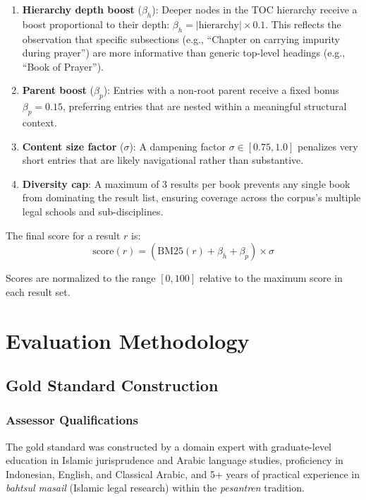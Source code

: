\documentclass[preprint,12pt,authoryear]{elsarticle}
\begin{document}
\begin{enumerate}
    \item \textbf{Hierarchy depth boost} ($\beta_h$): Deeper nodes in the TOC hierarchy receive a boost proportional to their depth: $\beta_h = |\text{hierarchy}| \times 0.1$. This reflects the observation that specific subsections (e.g., ``Chapter on carrying impurity during prayer'') are more informative than generic top-level headings (e.g., ``Book of Prayer'').

    \item \textbf{Parent boost} ($\beta_p$): Entries with a non-root parent receive a fixed bonus $\beta_p = 0.15$, preferring entries that are nested within a meaningful structural context.

    \item \textbf{Content size factor} ($\sigma$): A dampening factor $\sigma \in [0.75, 1.0]$ penalizes very short entries that are likely navigational rather than substantive.

    \item \textbf{Diversity cap}: A maximum of 3 results per book prevents any single book from dominating the result list, ensuring coverage across the corpus's multiple legal schools and sub-disciplines.
\end{enumerate}

The final score for a result $r$ is:
\begin{equation}
    \text{score}(r) = \left(\text{BM25}(r) + \beta_h + \beta_p\right) \times \sigma
    \label{eq:scoring}
\end{equation}

Scores are normalized to the range $[0, 100]$ relative to the maximum score in each result set.

\section{Evaluation Methodology}
\label{sec:methodology}

\subsection{Gold Standard Construction}
\label{sec:gold-standard}

\subsubsection{Assessor Qualifications}
The gold standard was constructed by a domain expert with graduate-level education in Islamic jurisprudence and Arabic language studies, proficiency in Indonesian, English, and Classical Arabic, and 5+ years of practical experience in \textit{bahtsul masail} (Islamic legal research) within the \textit{pesantren} tradition.
\end{document}
